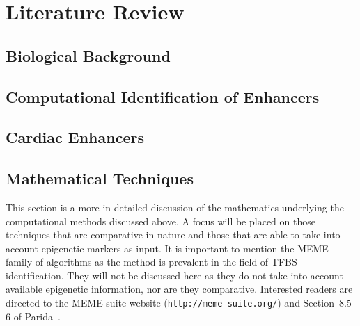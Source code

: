 \documentclass[12pt,a4paper]{article}
\author{D Maderazo}
\begin{document}
    

    \section{Literature Review}
        \subsection{Biological Background}
        
        \subsection{Computational Identification of Enhancers}
        \label{sSec:computational}
         
        \subsection{Cardiac Enhancers}
        
        \subsection{Mathematical Techniques}
        \label{sSec:mathematical}
        This section is a more in detailed discussion of the mathematics underlying the computational methods discussed above. A focus will be placed on those techniques that are comparative in nature and those that are able to take into account epigenetic markers as input. It is important to mention the MEME family of algorithms as the method is prevalent in the field of TFBS identification. They will not be discussed here as they do not take into account available epigenetic information, nor are they comparative. Interested readers are directed to the MEME suite website (\texttt{http://meme-suite.org/}) and Section~8.5-6 of Parida~\cite{parida2007pattern}.

            
\end{document}
